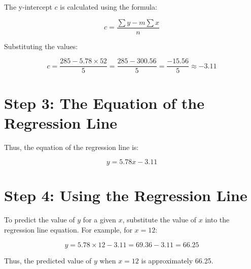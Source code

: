 \documentclass{article}
\begin{document}
The y-intercept \( c \) is calculated using the formula:

\[
c = \frac{\sum y - m \sum x}{n}
\]

Substituting the values:

\[
c = \frac{285 - 5.78 \times 52}{5} = \frac{285 - 300.56}{5} = \frac{-15.56}{5} \approx -3.11
\]

\section*{Step 3: The Equation of the Regression Line}

Thus, the equation of the regression line is:

\[
y = 5.78x - 3.11
\]

\section*{Step 4: Using the Regression Line}

To predict the value of \( y \) for a given \( x \), substitute the value of \( x \) into the regression line equation. For example, for \( x = 12 \):

\[
y = 5.78 \times 12 - 3.11 = 69.36 - 3.11 = 66.25
\]

Thus, the predicted value of \( y \) when \( x = 12 \) is approximately 66.25.
\end{document}
